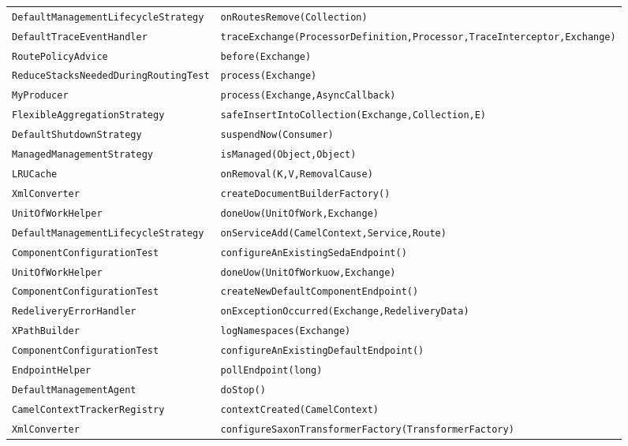 \begin{center}
\begin{longtable}{ll}
\lstinline/DefaultManagementLifecycleStrategy/&{\lstinline/onRoutesRemove(Collection)/}\\
\lstinline/DefaultTraceEventHandler/&{\lstinline/traceExchange(ProcessorDefinition,Processor,TraceInterceptor,Exchange)/}\\
\lstinline/RoutePolicyAdvice/&{\lstinline/before(Exchange)/}\\
\lstinline/ReduceStacksNeededDuringRoutingTest/&{\lstinline/process(Exchange)/}\\
\lstinline/MyProducer/&{\lstinline/process(Exchange,AsyncCallback)/}\\
\lstinline/FlexibleAggregationStrategy/&{\lstinline/safeInsertIntoCollection(Exchange,Collection,E)/}\\
\lstinline/DefaultShutdownStrategy/&{\lstinline/suspendNow(Consumer)/}\\
\lstinline/ManagedManagementStrategy/&{\lstinline/isManaged(Object,Object)/}\\
\lstinline/LRUCache/&{\lstinline/onRemoval(K,V,RemovalCause)/}\\
\lstinline/XmlConverter/&{\lstinline/createDocumentBuilderFactory()/}\\
\lstinline/UnitOfWorkHelper/&{\lstinline/doneUow(UnitOfWork,Exchange)/}\\
\lstinline/DefaultManagementLifecycleStrategy/&{\lstinline/onServiceAdd(CamelContext,Service,Route)/}\\
\lstinline/ComponentConfigurationTest/&{\lstinline/configureAnExistingSedaEndpoint()/}\\
\lstinline/UnitOfWorkHelper/&{\lstinline/doneUow(UnitOfWorkuow,Exchange)/}\\
\lstinline/ComponentConfigurationTest/&{\lstinline/createNewDefaultComponentEndpoint()/}\\
\lstinline/RedeliveryErrorHandler/&{\lstinline/onExceptionOccurred(Exchange,RedeliveryData)/}\\
\lstinline/XPathBuilder/&{\lstinline/logNamespaces(Exchange)/}\\
\lstinline/ComponentConfigurationTest/&{\lstinline/configureAnExistingDefaultEndpoint()/}\\
\lstinline/EndpointHelper/&{\lstinline/pollEndpoint(long)/}\\
\lstinline/DefaultManagementAgent/&{\lstinline/doStop()/}\\
\lstinline/CamelContextTrackerRegistry/&{\lstinline/contextCreated(CamelContext)/}\\
\lstinline/XmlConverter/&{\lstinline/configureSaxonTransformerFactory(TransformerFactory)/}\\

\end{longtable}
\end{center}
